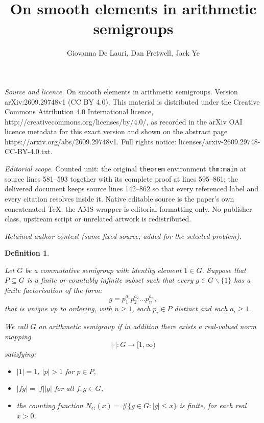 \documentclass[10pt,a4paper]{amsart}
\newtheorem{definition}{Definition}[section]
\begin{document}
\title[On smooth elements in arithmetic semigroups]{On smooth elements in arithmetic semigroups}
\author{Giovanna De Lauri, Dan Fretwell, Jack Ye}
\date{}
\maketitle
\noindent\emph{Source and licence.} On smooth elements in arithmetic semigroups. Version arXiv:2609.29748v1 (CC BY 4.0). This material is distributed under the Creative Commons Attribution 4.0 International licence, http://creativecommons.org/licenses/by/4.0/, as recorded in the arXiv OAI licence metadata for this exact version and shown on the abstract page https://arxiv.org/abs/2609.29748v1. Full rights notice: licenses/arxiv-2609.29748-CC-BY-4.0.txt.\par\smallskip
\noindent\textit{Editorial scope.} Counted unit: the original \texttt{theorem} environment \texttt{thm:main} at source lines 581--593 together with its complete proof at lines 595--861; the delivered document keeps source lines 142--862 so that every referenced label and every citation resolves inside it. Native editable source is the paper's own concatenated TeX; the AMS wrapper is editorial formatting only. No publisher class, upstream script or unrelated artwork is redistributed.
\par\medskip\noindent\textit{Retained author context (same fixed source; added for the selected problem).}\par
\begin{definition}\label{def:arithmetic-semigroup}

Let $G$ be a commutative semigroup with identity element $1\in G$. Suppose that $P\subseteq G$ is a finite or countably infinite subset such that every $g\in G\backslash\{1\}$ has a finite factorisation of the form: \[g = p_1^{a_1}p_2^{a_2}...p_n^{a_n},\] that is unique up to ordering, with $n\geq 1$, each $p_i\in P$ distinct and each $a_i\geq 1$.

        We call $G$ an arithmetic semigroup if in addition there exists a real-valued \textit{norm mapping}
\[
|\cdot|:G\longrightarrow[1,\infty)
\]
satisfying:

\begin{itemize}
    \item[(i)] $|1| = 1$, $|p| > 1$ for $p \in P$,
    \item[(ii)] $|fg| = |f| |g|$ for all $f,g \in G$,
    \item[(iii)] the counting function $N_G(x) =\#\{g\in G:|g|\le x\}$ is finite, for each real $x > 0$.
\end{itemize}
\end{definition}
\end{document}
